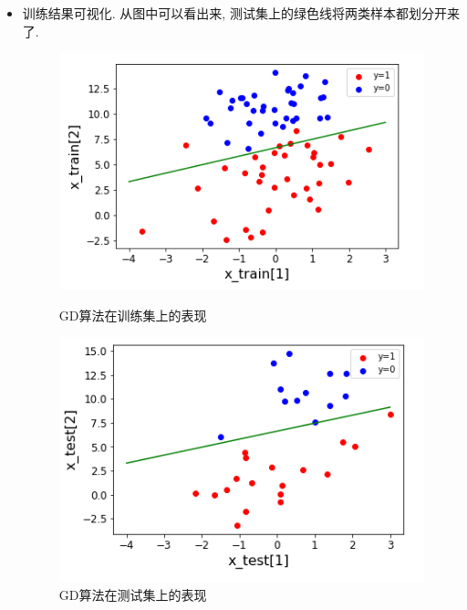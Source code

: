 \documentclass[UTF8]{article}
\begin{document}
\begin{itemize}
	\item 训练结果可视化. 从图中可以看出来, 测试集上的绿色线将两类样本都划分开来了.
	\begin{figure}[H]
		\begin{minipage}[H]{0.5\linewidth}
			\centering
			\includegraphics[width=\linewidth]{gd_train.png}
			\caption{GD算法在训练集上的表现}
		\end{minipage}
		\begin{minipage}[H]{0.5\linewidth}
			\centering
			\includegraphics[width=\linewidth]{gd_test.png}
			\caption{GD算法在测试集上的表现}
		\end{minipage}
	\end{figure}
\end{itemize}
\end{document}
